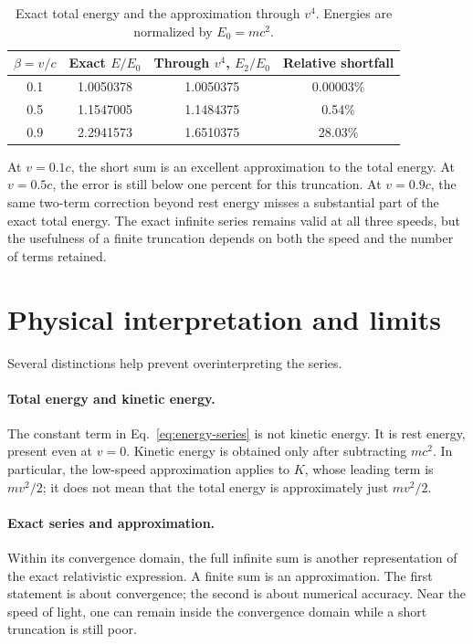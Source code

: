 \documentclass[12pt]{article}
\begin{document}
\begin{table}[ht]
  \centering
  \caption{Exact total energy and the approximation through $v^4$. Energies are normalized by $E_0=mc^2$.}
  \label{tab:comparison}
  \begin{tabular}{cccc}
    \toprule
    $\beta=v/c$ & Exact $E/E_0$ & Through $v^4$, $E_2/E_0$ & Relative shortfall \\
    \midrule
    0.1 & 1.0050378 & 1.0050375 & 0.00003\% \\
    0.5 & 1.1547005 & 1.1484375 & 0.54\% \\
    0.9 & 2.2941573 & 1.6510375 & 28.03\% \\
    \bottomrule
  \end{tabular}
\end{table}

At $v=0.1c$, the short sum is an excellent approximation to the total energy. At $v=0.5c$, the error is still below one percent for this truncation. At $v=0.9c$, the same two-term correction beyond rest energy misses a substantial part of the exact total energy. The exact infinite series remains valid at all three speeds, but the usefulness of a finite truncation depends on both the speed and the number of terms retained.

\section{Physical interpretation and limits}

Several distinctions help prevent overinterpreting the series.

\paragraph{Total energy and kinetic energy.}
The constant term in Eq.~\eqref{eq:energy-series} is not kinetic energy. It is rest energy, present even at $v=0$. Kinetic energy is obtained only after subtracting $mc^2$. In particular, the low-speed approximation applies to $K$, whose leading term is $mv^2/2$; it does not mean that the total energy is approximately just $mv^2/2$.

\paragraph{Exact series and approximation.}
Within its convergence domain, the full infinite sum is another representation of the exact relativistic expression. A finite sum is an approximation. The first statement is about convergence; the second is about numerical accuracy. Near the speed of light, one can remain inside the convergence domain while a short truncation is still poor.
\end{document}
